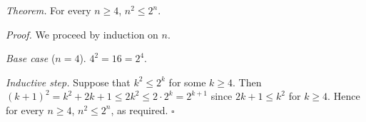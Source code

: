 \textit{Theorem.} For every $n \geq 4$, $n^{2} \leq 2^{n}$.

\textit{Proof.} We proceed by induction on $n$.

\textit{Base case} ($n = 4$). $4^{2} = 16 = 2^{4}$.

\textit{Inductive step.} Suppose that $k^{2} \leq 2^{k}$ for some $k \geq 4$.
Then $(k + 1)^{2} = k^{2} + 2k + 1 \leq 2k^{2} \leq 2 \cdot 2^{k} = 2^{k + 1}$ since $2k + 1 \leq k^{2}$ for $k \geq 4$.
Hence for every $n \geq 4$, $n^{2} \leq 2^{n}$, as required. \hfill$\square$